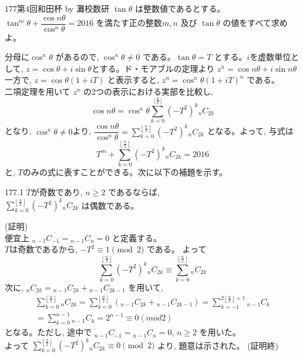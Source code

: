 \begin{thm}{177}{}{第4回和田杯 by 灘校数研}
 $\tan{\theta}$ は整数値であるとする。\\
 $\tan^m{\theta}+\dfrac{\cos{n\theta}}{\cos^n{\theta}}=2016$ を満たす正の整数$m,n$ 及び $\tan{\theta}$ の値をすべて求めよ。
\end{thm}

分母に$\cos^n{\theta}$ があるので, $\cos^n{\theta}\neq 0$ である。$\tan{\theta}=T$ とする。$i$を虚数単位として, $z=\cos{\theta}+i\sin{\theta}$とする。ド・モアブルの定理より $z^n=\cos{n\theta}+i\sin{n\theta}$\\
一方で, $z=\cos{\theta}\left(1+iT\right)$ と表示すると, $z^n=\cos^n{\theta}\left(1+iT \right)^n $ である。\\
二項定理を用いて $z^n$ の2つの表示における実部を比較し,
\[\cos{n\theta}=\cos^n{\theta}\displaystyle\sum_{k=0}^{\lfloor\frac{n}{2}\rfloor} (-T^2)^k{}_nC_{2k}\]
となり, $\cos^n{\theta}\neq 0$より, $\dfrac{\cos{n\theta}}{\cos^n{\theta}} = \displaystyle\sum_{k=0}^{\left\lfloor\frac{n}{2}\right\rfloor} (-T^2)^k{}_nC_{2k}$ となる。よって, 与式は
\[T^m+\displaystyle\sum_{k=0}^{\left\lfloor\frac{n}{2}\right\rfloor} (-T^2)^k{}_nC_{2k}=2016\] と, $T$のみの式に表すことができる。次に以下の補題を示す。

\begin{subthm}{177.1}
  $T$が奇数であり, $n\ge 2$ であるならば, \\
 $\displaystyle\sum_{k=0}^{\left\lfloor\frac{n}{2}\right\rfloor} (-T^2)^k{}_nC_{2k}$ は偶数である。
\end{subthm}

(証明) \\
便宜上 ${}_{n-1}C_{-1}={}_{n-1}C_{n}=0$ と定義する。\\
$T$は奇数であるから, $-T^2\equiv 1 \pmod{2}$ である。 よって
\[ \sum_{k=0}^{\left\lfloor\frac{n}{2}\right\rfloor} (-T^2)^k{}_nC_{2k}\equiv \displaystyle\sum_{k=0}^{\left\lfloor\frac{n}{2}\right\rfloor} {}_nC_{2k} \]
次に, ${}_nC_{2k} ={}_{n-1}C_{2k}+{}_{n-1}C_{2k-1}$ を用いて, 
\begin{eqnarray*}
 \displaystyle\sum_{k=0}^{\left\lfloor\frac{n}{2}\right\rfloor} {}_nC_{2k} =\displaystyle\sum_{k=0}^{\left\lfloor\frac{n}{2}\right\rfloor} ({}_{n-1}C_{2k}+{}_{n-1}C_{2k-1} )= \displaystyle\sum_{k=-1}^{2\left\lfloor\frac{n}{2} \right\rfloor +1} {}_{n-1}C_{k} \\
= \displaystyle\sum_{k=0}^{n-1} {}_{n-1}C_{k} =2^{n-1} \equiv 0 (mod 2)
\end{eqnarray*}
となる。ただし, 途中で ${}_{n-1}C_{-1}={}_{n-1}C_{n}=0$, $n\ge 2$ を用いた。\\
よって $\displaystyle\sum_{k=0}^{\left\lfloor\frac{n}{2}\right\rfloor} (-T^2)^k{}_nC_{2k}\equiv 0 \pmod{2}$ より, 題意は示された。   (証明終)

